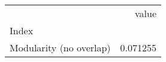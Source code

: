 \begin{tabular}{lr}
\toprule
{} &     value \\
Index                   &           \\
\midrule
Modularity (no overlap) &  0.071255 \\
\bottomrule
\end{tabular}
